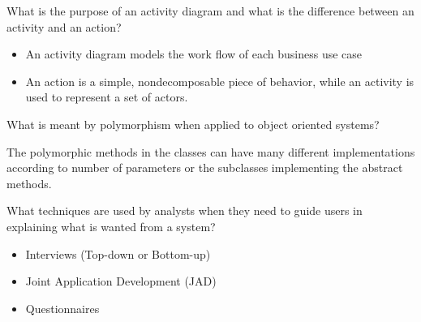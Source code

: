 \documentclass[10pt,a4paper,answers]{exam}
\begin{document}
\begin{questions}
\begin{solution}
\begin{itemize}
\end{itemize}
\end{solution}


\question What is the purpose of an activity diagram and what is the difference between an activity and an action?
\begin{solution}
\begin{itemize}

        \item An activity diagram models the work flow of each business use case
        \item An action is a simple, nondecomposable piece of behavior, while an activity is used to represent a set of actors.

\end{itemize}
\end{solution}


\question What is meant by polymorphism when applied to object oriented systems?
\begin{solution}

        The polymorphic methods in the classes can have many different implementations according to number of parameters or the subclasses implementing the abstract methods.

\end{solution}


\question What techniques are used by analysts when they need to guide users in explaining what is wanted from a system?
\begin{solution}
\begin{itemize}

        \item Interviews (Top-down or Bottom-up)
        \item Joint Application Development (JAD)
        \item Questionnaires

\end{itemize}
\end{solution}


\end{questions}
\end{document}
